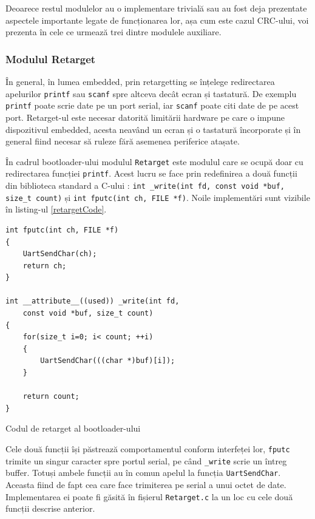 \documentclass[12pt,a4paper,titlepage]{report}
\begin{document}
Deoarece restul modulelor au o implementare trivială sau au fost deja prezentate aspectele importante legate de funcționarea lor, așa cum este cazul CRC-ului, voi prezenta în cele ce urmează trei dintre modulele auxiliare.

\subsubsection{Modulul Retarget}
În general, în lumea embedded, prin retargetting se înțelege redirectarea apelurilor \texttt{printf} sau \texttt{scanf} spre altceva decât ecran și tastatură. De exemplu \texttt{printf} poate scrie date pe un port serial, iar \texttt{scanf} poate citi date de pe acest port. Retarget-ul este necesar datorită limitării hardware pe care o impune dispozitivul embedded, acesta neavând un ecran și o tastatură încorporate și în general fiind necesar să ruleze fără asemenea periferice atașate.

În cadrul bootloader-ului modulul \texttt{Retarget} este modulul care se ocupă doar cu redirectarea funcției \texttt{printf}. Acest lucru se face prin redefinirea a două funcții din biblioteca standard a C-ului \cite{retarget}: \texttt{int \_write(int fd, const void *buf, size\_t count)} și \texttt{int fputc(int ch, FILE *f)}. Noile implementări sunt vizibile în listing-ul \ref{retargetCode}.

\begin{listing}[h]
\begin{verbatim}
int fputc(int ch, FILE *f)
{
    UartSendChar(ch);
    return ch;
}

int __attribute__((used)) _write(int fd,
    const void *buf, size_t count)
{
    for(size_t i=0; i< count; ++i)
    {
        UartSendChar(((char *)buf)[i]);
    }

    return count;
}
\end{verbatim}

\caption{Codul de retarget al bootloader-ului}
\label{retargetCode}
\end{listing}

Cele două funcții își păstrează comportamentul conform interfeței lor, \texttt{fputc} trimite un singur caracter spre portul serial, pe când \texttt{\_write} scrie un întreg buffer. Totuși ambele funcții au în comun apelul la funcția \texttt{UartSendChar}. Aceasta fiind de fapt cea care face trimiterea pe serial a unui octet de date. Implementarea ei poate fi găsită în fișierul \texttt{Retarget.c} la un loc cu cele două funcții descrise anterior.
\end{document}
